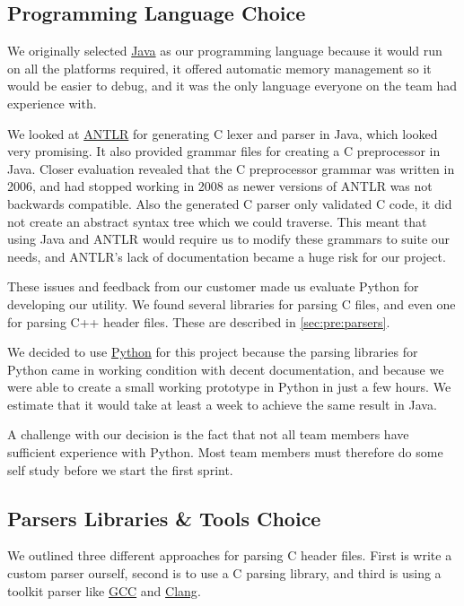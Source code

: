 \subsection{Programming Language Choice}
\label{sec:pre:langchoice}
We originally selected \hyperref[sec:pre:java]{Java} as our programming
language because it would run on all the platforms required, it offered
automatic memory management so it would be easier to debug, and it was the only
language everyone on the team had experience with.

We looked at \hyperref[sec:pre:antlr]{ANTLR} for generating
C lexer and parser in Java, which looked very promising. It also provided
grammar files for creating a C preprocessor in Java. Closer evaluation revealed
that the C preprocessor grammar was written in 2006, and had stopped working in
2008 as newer versions of ANTLR was not backwards compatible. Also the
generated C parser only validated C code, it did not create an abstract syntax
tree which we could traverse. This meant that using Java and ANTLR would
require us to modify these grammars to suite our needs, and ANTLR's lack of
documentation became a huge risk for our project.

These issues and feedback from our customer made us evaluate Python for
developing our utility. We found several libraries for parsing C files, and
even one for parsing C++ header files. These are described in
\autoref{sec:pre:parsers}.

We decided to use \hyperref[sec:pre:python]{Python} for this project because
the parsing libraries for Python came in working condition with decent
documentation, and because we were able to create a small working prototype
in Python in just a few hours. We estimate that it would take at least a week
to achieve the same result in Java.

A challenge with our decision is the fact that not all team members have
sufficient experience with Python. Most team members must therefore do some
self study before we start the first sprint.

\subsection{Parsers Libraries \& Tools Choice}
\label{sec:pre:parserchoice}
We outlined three different approaches for parsing C header files. First is
write a custom parser ourself, second is to use a C parsing library, and
third is using a toolkit parser like \hyperref[sec:pre:gcc]{GCC} and
\hyperref[sec:pre:clang]{Clang}.

